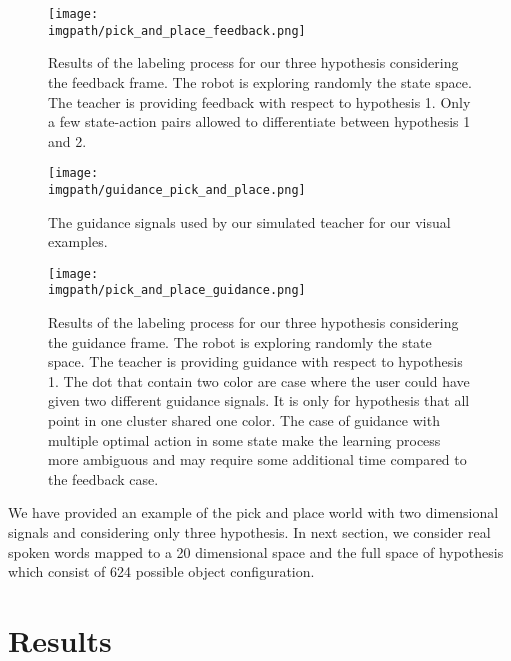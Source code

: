 \begin{figure}[!ht]
  \centering
  \texttt{[image: \\imgpath/pick\_and\_place\_feedback.png]}
  \caption{Results of the labeling process for our three hypothesis considering the feedback frame. The robot is exploring randomly the state space. The teacher is providing feedback with respect to hypothesis 1. Only a few state-action pairs allowed to differentiate between hypothesis 1 and 2.}
  \label{fig:lfui:pickplacefeedback}
\end{figure}

\begin{figure}[!ht]
  \centering
  \texttt{[image: \\imgpath/guidance\_pick\_and\_place.png]}
  \caption{The guidance signals used by our simulated teacher for our visual examples.}
  \label{fig:lfui:pickplaceguidancesignals}
\end{figure}

\begin{figure}[!ht]
  \centering
  \texttt{[image: \\imgpath/pick\_and\_place\_guidance.png]}
  \caption{Results of the labeling process for our three hypothesis considering the guidance frame. The robot is exploring randomly the state space. The teacher is providing guidance with respect to hypothesis 1. The dot that contain two color are case where the user could have given two different guidance signals. It is only for hypothesis that all point in one cluster shared one color. The case of guidance with multiple optimal action in some state make the learning process more ambiguous and may require some additional time compared to the feedback case.}
  \label{fig:lfui:pickplaceguidance}
\end{figure}


We have provided an example of the pick and place world with two dimensional signals and considering only three hypothesis. In next section, we consider real spoken words mapped to a 20 dimensional space and the full space of hypothesis which consist of 624 possible object configuration.

\section{Results}

